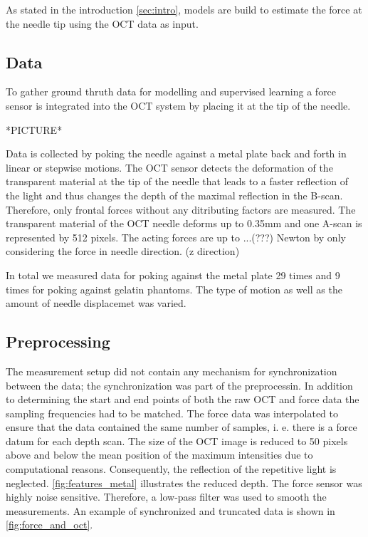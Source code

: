 

As stated in the introduction \ref{sec:intro}, models are build to estimate the force at the needle tip 
using the OCT data as input.

\subsection{Data}

To gather ground thruth data for modelling and supervised learning a force sensor is integrated into the OCT system by placing it at the tip of the needle.

*PICTURE*

Data is collected by poking the needle against a metal plate back and forth in linear or stepwise motions.
The OCT sensor detects the deformation of the transparent material at the tip of the needle that leads to a faster reflection of the light and thus
changes the depth of the maximal reflection in the B-scan.
Therefore, only frontal forces without any ditributing factors are measured.
The transparent material of the OCT needle deforms up to 0.35mm and one A-scan is represented by 512 pixels.
The acting forces are up to ...(???) Newton by only considering the force in needle direction. (z direction)

In total we measured data for poking against the metal plate 29 times and 9 times for poking against gelatin phantoms.
The type of motion as well as the amount of needle displacemet was varied.

\subsection{Preprocessing}

The measurement setup did not contain any mechanism for synchronization between the data; the synchronization was part of the preprocessin.
In addition to determining the start and end points of both the raw OCT and force data the sampling frequencies had to be matched.
The force data was interpolated to ensure that the data contained the same number of samples, i. e. there is a force datum for each depth scan.
The size of the OCT image is reduced to 50 pixels above and below the mean position of the maximum intensities due to
computational reasons.
Consequently, the reflection of the repetitive light is neglected.
\cref{fig:features_metal} illustrates the reduced depth.
The force sensor was highly noise sensitive.
Therefore, a low-pass filter was used to smooth the measurements.
An example of synchronized and truncated data is shown in \cref{fig:force_and_oct}.

